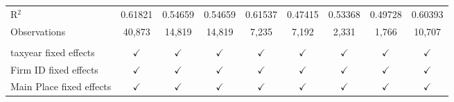 \begin{tabular}{lcccccccc}
    \\
   R$^2$                                   & 0.61821       & 0.54659       & 0.54659       & 0.61537       & 0.47415        & 0.53368       & 0.49728       & 0.60393\\  
   Observations                            & 40,873        & 14,819        & 14,819        & 7,235         & 7,192          & 2,331         & 1,766         & 10,707\\  
    \\
   taxyear fixed effects                   & $\checkmark$  & $\checkmark$  & $\checkmark$  & $\checkmark$  & $\checkmark$   & $\checkmark$  & $\checkmark$  & $\checkmark$\\   
   Firm ID fixed effects                   & $\checkmark$  & $\checkmark$  & $\checkmark$  & $\checkmark$  & $\checkmark$   & $\checkmark$  & $\checkmark$  & $\checkmark$\\   
   Main Place fixed effects                & $\checkmark$  & $\checkmark$  & $\checkmark$  & $\checkmark$  & $\checkmark$   & $\checkmark$  & $\checkmark$  & $\checkmark$\\   
   \bottomrule
\end{tabular}
\par\endgroup
